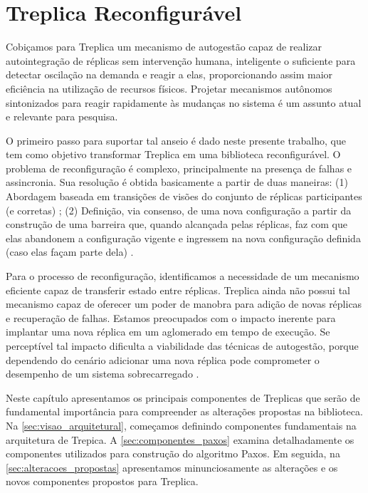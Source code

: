 \chapter{Treplica Reconfigurável}\label{cap2}

Cobiçamos para Treplica um mecanismo de autogestão capaz de realizar autointegração de
réplicas sem intervenção humana, inteligente o suficiente para detectar oscilação na
demanda e reagir a elas, proporcionando assim maior eficiência na utilização de recursos
físicos. Projetar mecanismos autônomos sintonizados para reagir rapidamente às mudanças no
sistema é um assunto atual e relevante para pesquisa.

O primeiro passo para suportar tal anseio é dado neste presente trabalho, que tem como
objetivo transformar Treplica em uma biblioteca reconfigurável. O problema de
reconfiguração é complexo, principalmente na presença de falhas e assincronia. Sua
resolução é obtida basicamente a partir de duas maneiras: (1) Abordagem baseada em
transições de visões do conjunto de réplicas participantes (e corretas) \cite{birman87a,
birman87b}; (2) Definição, via consenso, de uma nova configuração a partir da construção
de uma barreira que, quando alcançada pelas réplicas, faz com que elas abandonem a
configuração vigente e ingressem na nova configuração definida (caso elas façam parte
dela) \cite{lamport10}.

Para o processo de reconfiguração, identificamos a necessidade de um mecanismo eficiente
capaz de transferir estado entre réplicas. Treplica ainda não possui tal mecanismo capaz
de oferecer um poder de manobra para adição de novas réplicas e recuperação de falhas.
Estamos preocupados com o impacto inerente para implantar uma nova réplica em um
aglomerado em tempo de execução. Se perceptível tal impacto dificulta a viabilidade das
técnicas de autogestão, porque dependendo do cenário adicionar uma nova réplica pode
comprometer o desempenho de um sistema sobrecarregado \cite{vilaca09}.

Neste capítulo apresentamos os principais componentes de Treplicas que serão de
fundamental importância para compreender as alterações propostas na biblioteca. Na
\autoref{sec:visao_arquitetural}, começamos definindo componentes fundamentais na
arquitetura de Trepica. A \autoref{sec:componentes_paxos} examina detalhadamente os
componentes utilizados para construção do algoritmo Paxos. Em seguida, na
\autoref{sec:alteracoes_propostas} apresentamos minunciosamente as alterações e os novos
componentes propostos para Treplica.


